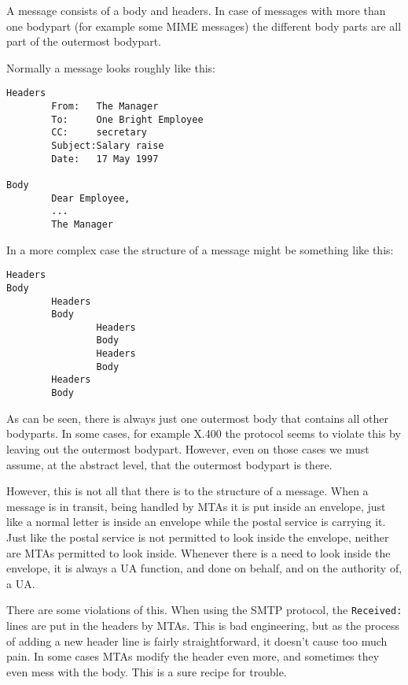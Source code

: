 A message consists of a body and headers. In case of messages with more 
than one bodypart (for example some MIME messages) the different body 
parts are all part of the outermost bodypart.

Normally a message looks roughly like this:
\begin{tscreen}
\begin{verbatim}
Headers
        From:   The Manager
        To:     One Bright Employee
        CC:     secretary
        Subject:Salary raise
        Date:   17 May 1997

Body
        Dear Employee,
        ...
        The Manager
\end{verbatim}
\end{tscreen}


In a more complex case the structure of a message might be something like this:
\begin{tscreen}
\begin{verbatim}
Headers
Body
        Headers
        Body
                Headers
                Body
                Headers
                Body
        Headers
        Body
\end{verbatim}
\end{tscreen}


As can be seen, there is always just one outermost body that contains 
all other bodyparts. In some cases, for example X.400 the protocol 
seems to violate this by leaving out the outermost bodypart. However, 
even on those cases we must assume, at the abstract level, 
that the outermost bodypart is there.

However, this is not all that there is to the structure of a message. 
When a message is in transit, being handled by MTAs it is put inside 
an envelope, just like a normal letter is inside an envelope while 
the postal service is carrying it. Just like the postal service is not 
permitted to look inside the envelope, neither are MTAs permitted 
to look inside. Whenever there is a need to look inside the envelope, 
it is always a UA function, and done on behalf, and on the authority of, a UA.

There are some violations of this. When using the SMTP protocol, the 
{\tt Received:} lines are put in the headers by MTAs. This is bad 
engineering, but as the process of adding a new header line is fairly 
straightforward, it doesn't cause too much pain. In some cases MTAs 
modify the header even more, and sometimes they even mess with the body. 
This is a sure recipe for trouble.




